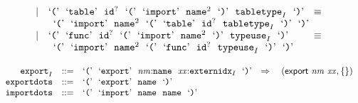 $$\begin{array}[t]{@{}lrrl@{}l@{}l@{}l@{}}
{} \\
& & | & \mbox{‘\texttt{{(}}’}~~\mbox{‘\texttt{table}’}~~{{\mathtt{id}}^?}~~\mbox{‘\texttt{{(}}’}~~\mbox{‘\texttt{import}’}~~{{\mathtt{name}}^{2}}~~\mbox{‘\texttt{{)}}’}~~{{\mathtt{tabletype}}}_{I}~~\mbox{‘\texttt{{)}}’} & \quad\equiv\quad{} & & \\
&&& \multicolumn{4}{@{}l@{}}{\quad
\begin{array}[t]{@{}l@{}}
\mbox{‘\texttt{{(}}’}~~\mbox{‘\texttt{import}’}~~{{\mathtt{name}}^{2}}~~\mbox{‘\texttt{{(}}’}~~\mbox{‘\texttt{table}’}~~{{\mathtt{id}}^?}~~{{\mathtt{tabletype}}}_{I}~~\mbox{‘\texttt{{)}}’}~~\mbox{‘\texttt{{)}}’} \\
\end{array}
} \\
& & | & \mbox{‘\texttt{{(}}’}~~\mbox{‘\texttt{func}’}~~{{\mathtt{id}}^?}~~\mbox{‘\texttt{{(}}’}~~\mbox{‘\texttt{import}’}~~{{\mathtt{name}}^{2}}~~\mbox{‘\texttt{{)}}’}~~{{\mathtt{typeuse}}}_{I}~~\mbox{‘\texttt{{)}}’} & \quad\equiv\quad{} & & \\
&&& \multicolumn{4}{@{}l@{}}{\quad
\begin{array}[t]{@{}l@{}}
\mbox{‘\texttt{{(}}’}~~\mbox{‘\texttt{import}’}~~{{\mathtt{name}}^{2}}~~\mbox{‘\texttt{{(}}’}~~\mbox{‘\texttt{func}’}~~{{\mathtt{id}}^?}~~{{\mathtt{typeuse}}}_{I}~~\mbox{‘\texttt{{)}}’}~~\mbox{‘\texttt{{)}}’} \\
\end{array}
} \\
\end{array}
$$

\vspace{1ex}

$$
\begin{array}[t]{@{}lrrl@{}l@{}l@{}l@{}}
& {{\mathtt{export}}}_{I} & ::= & \mbox{‘\texttt{{(}}’}~~\mbox{‘\texttt{export}’}~~{\mathit{nm}}{:}{\mathtt{name}}~~{\mathit{xx}}{:}{{\mathtt{externidx}}}_{I}~~\mbox{‘\texttt{{)}}’} & \quad\Rightarrow\quad{} & (\mathsf{export}~{\mathit{nm}}~{\mathit{xx}}, \{  \}) \\
& {\mathtt{exportdots}} & ::= & \mbox{‘\texttt{{(}}’}~~\mbox{‘\texttt{export}’}~~{\mathtt{name}}~~\mbox{‘\texttt{{)}}’} \\
& {\mathtt{importdots}} & ::= & \mbox{‘\texttt{{(}}’}~~\mbox{‘\texttt{import}’}~~{\mathtt{name}}~~{\mathtt{name}}~~\mbox{‘\texttt{{)}}’} \\
\end{array}
$$


